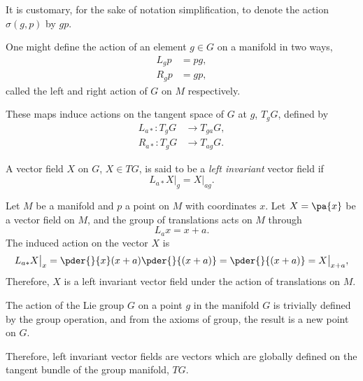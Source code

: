It is customary, for the sake of notation simplification, to denote the action $\sigma(g, p)$ by $g p$.

One might define the action of an element $g \in G$ on a manifold in two ways,
\begin{equation}
  \begin{split}
    L_g p &= p g, \\
    R_g p &= g p,
  \end{split}
\end{equation}
called the left and right action of $G$ on $M$ respectively.

These maps induce actions on the tangent space of $G$ at $g$, $T_g G$, defined by
\begin{equation}
  \begin{split}
    L_{a*} : T_g G &\to T_{ga} G, \\
    R_{a*} : T_g G &\to T_{ag} G.
  \end{split}
\end{equation}

\begin{Def}
  A vector field $X$ on $G$, $X \in TG$, is said to be a \emph{left invariant} vector field if
  \begin{equation}
    L_{a*} X \bigr|_{g} = X \bigr|_{ag}.
  \end{equation}
\end{Def}

\begin{WEbox}[%
    frametitle={Left Invariant Vector Field},
    frametitlerule=true,
    frametitlealignment=\centering,
    frametitleaboveskip=10pt,]
  Let $M$ be a manifold and $p$ a point on $M$ with coordinates $x$. Let $X = \pa{x}$ be a vector field on $M$, and the group of translations acts on $M$ through 
  \begin{equation}
    L_a x = x + a.
  \end{equation}
  The induced action on the vector $X$ is
  \begin{equation}
    L_{a*} X \bigr|_x = \pder{}{x}(x + a) \pder{}{(x + a)} = \pder{}{(x + a)} = X \bigr|_{x+a},
  \end{equation}
  Therefore, $X$ is a left invariant vector field under the action of translations on $M$.
\end{WEbox}

\begin{infobox}
  The action of the Lie group $G$ on a point $g$ in the manifold $G$ is trivially defined by the group operation, and from the axioms of group, the result is a new point on $G$.

  Therefore, left invariant vector fields are vectors which are globally defined on the tangent bundle of the group manifold, $TG$. 
\end{infobox}

